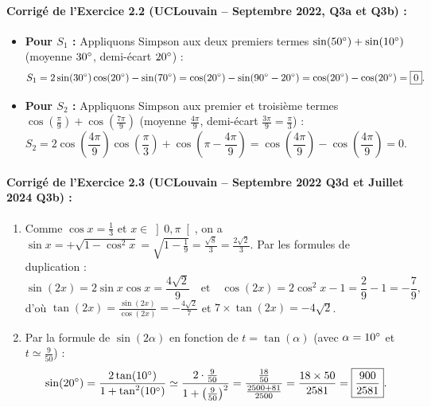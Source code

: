 \paragraph{Corrigé de l'Exercice 2.2 (UCLouvain -- Septembre 2022, Q3a et Q3b) :}
\begin{itemize}
    \item \textbf{Pour $S_1$ :} Appliquons Simpson aux deux premiers termes $\sin(50\degree) + \sin(10\degree)$ (moyenne $30\degree$, demi-écart $20\degree$) :
    \[
        S_1 = 2\sin(30\degree)\cos(20\degree) - \sin(70\degree) = \cos(20\degree) - \sin(90\degree - 20\degree) = \cos(20\degree) - \cos(20\degree) = \boxed{0}.
    \]
    \item \textbf{Pour $S_2$ :} Appliquons Simpson aux premier et troisième termes $\cos\left(\frac{\pi}{9}\right) + \cos\left(\frac{7\pi}{9}\right)$ (moyenne $\frac{4\pi}{9}$, demi-écart $\frac{3\pi}{9} = \frac{\pi}{3}$) :
    \[
        S_2 = 2\cos\left(\frac{4\pi}{9}\right)\cos\left(\frac{\pi}{3}\right) + \cos\left(\pi - \frac{4\pi}{9}\right) = \cos\left(\frac{4\pi}{9}\right) - \cos\left(\frac{4\pi}{9}\right) = \boxed{0}.
    \]
\end{itemize}

\paragraph{Corrigé de l'Exercice 2.3 (UCLouvain -- Septembre 2022 Q3d et Juillet 2024 Q3b) :}
\begin{enumerate}[label=(\alph*)]
    \item Comme $\cos x = \frac{1}{3}$ et $x \in \left]0, \pi\right[$, on a $\sin x = +\sqrt{1 - \cos^2 x} = \sqrt{1 - \frac{1}{9}} = \frac{\sqrt{8}}{3} = \frac{2\sqrt{2}}{3}$. Par les formules de duplication :
    \[
        \sin(2x) = 2\sin x\cos x = \frac{4\sqrt{2}}{9} \quad \text{et} \quad \cos(2x) = 2\cos^2 x - 1 = \frac{2}{9} - 1 = -\frac{7}{9},
    \]
    d'où $\tan(2x) = \frac{\sin(2x)}{\cos(2x)} = -\frac{4\sqrt{2}}{7}$ et $7\times\tan(2x) = \boxed{-4\sqrt{2}}$.
    \item Par la formule de $\sin(2\alpha)$ en fonction de $t = \tan(\alpha)$ (avec $\alpha = 10\degree$ et $t \simeq \frac{9}{50}$) :
    \[
        \sin(20\degree) = \frac{2\tan(10\degree)}{1 + \tan^2(10\degree)} \simeq \frac{2 \cdot \frac{9}{50}}{1 + \left(\frac{9}{50}\right)^2} = \frac{\frac{18}{50}}{\frac{2500 + 81}{2500}} = \frac{18 \times 50}{2581} = \boxed{\frac{900}{2581}}.
    \]
\end{enumerate}


